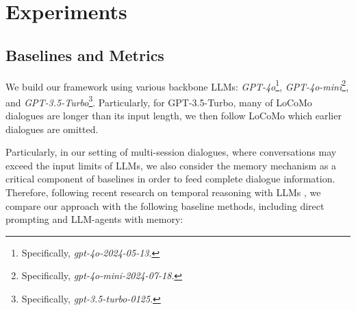 
\section{Experiments}

\subsection{Baselines and Metrics} 
We build our framework using various backbone LLMs: \textit{GPT-4o}\footnote{Specifically, \textit{gpt-4o-2024-05-13}.}, \textit{GPT-4o-mini}\footnote{Specifically, \textit{gpt-4o-mini-2024-07-18}.}, and \textit{GPT-3.5-Turbo}\footnote{Specifically, \textit{gpt-3.5-turbo-0125}.}. Particularly, for GPT-3.5-Turbo, many of LoCoMo dialogues are longer than its input length, we then follow LoCoMo \cite{maharana-etal-2024-evaluating} which earlier dialogues are omitted. 


Particularly, in our setting of multi-session dialogues, where conversations may exceed the input limits of LLMs, we also consider the memory mechanism as a critical component of baselines in order to feed complete dialogue information. Therefore, following recent research on temporal reasoning with LLMs \cite{wang-zhao-2024-tram, xiong-etal-2024-large}, we compare our approach with the following baseline methods, including direct prompting and LLM-agents with memory:

\begin{table*}[ht]
\small
\centering
{}
\caption{\label{gpt4o_result} Experimental results of various methods based on GPT-4o. We use TA to represent Temporal Anchoring, TP for Temporal Precedence and TI for Temporal Interval.}
\vspace{-0.3cm}
\end{table*}

